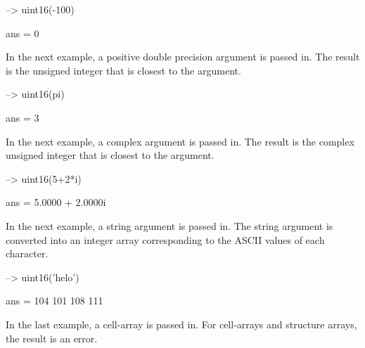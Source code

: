 \begin{DoxyVerbInclude}
--> uint16(-100)

ans = 
 0 
\end{DoxyVerbInclude}


In the next example, a positive double precision argument is passed in. The result is the unsigned integer that is closest to the argument.


\begin{DoxyVerbInclude}
--> uint16(pi)

ans = 
 3 
\end{DoxyVerbInclude}


In the next example, a complex argument is passed in. The result is the complex unsigned integer that is closest to the argument.


\begin{DoxyVerbInclude}
--> uint16(5+2*i)

ans = 
   5.0000 +  2.0000i 
\end{DoxyVerbInclude}


In the next example, a string argument is passed in. The string argument is converted into an integer array corresponding to the A\-S\-C\-I\-I values of each character.


\begin{DoxyVerbInclude}
--> uint16('helo')

ans = 
 104 101 108 111 
\end{DoxyVerbInclude}


In the last example, a cell-\/array is passed in. For cell-\/arrays and structure arrays, the result is an error.


